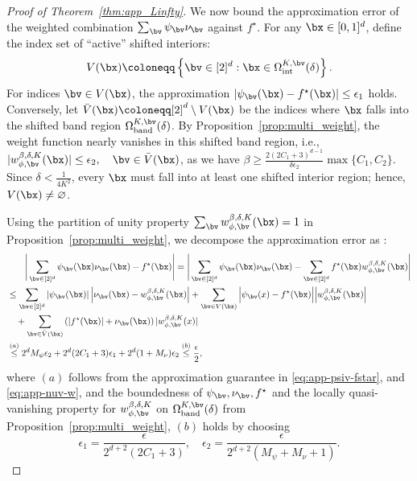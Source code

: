 \documentclass[11pt]{article}
\begin{document}
\begin{proof}[Proof of Theorem~\ref{thm:app_Linfty}]
    
    We now bound the approximation error of the weighted combination $\sum_{\bv} \psi_{\bv} \nu_{\bv}$ against $f^{\star}$.
    For any $\bx \in [0,1]^d$, define the index set of ``active'' shifted interiors:
    \begin{equation*}
        V(\bx) \coloneqq  \left\{ \bv \in [2]^d : \bx \in \Omega_{\mathrm{int}}^{K, \bv}(\delta) \right\}.
    \end{equation*}
    For indices $\bv \in V(\bx)$, the approximation $|\psi_{\bv}(\bx) - f^{\star}(\bx)| \leq \epsilon_1$ holds. Conversely, let $\bar{V}(\bx) \coloneqq  [2]^d \setminus V(\bx)$ be the indices where $\bx$ falls into the shifted band region $\Omega_{\mathrm{band}}^{K, \bv}(\delta)$. By Proposition~\ref{prop:multi_weight}, the weight function nearly vanishes in this shifted band region, i.e., $|w_{\phi, \bv}^{\beta,\delta, K}(\bx)| \leq \epsilon_2, \quad \bv \in \bar{{V}}(\bx)$, as we have $\beta \ge \frac{2(2C_1+3)^{d-1}}{\delta \epsilon_2} \max\{C_1,C_2\}$. Since $\delta  < \frac{1}{4K^2}$, every $\bx$ must fall into at least one shifted interior region; hence, ${V}(\bx) \neq \varnothing$.

    

    Using the partition of unity property $\sum_{\bv} w_{\phi, \bv}^{\beta, \delta, K}(\bx) = 1$ in Proposition~\ref{prop:multi_weight}, we decompose the approximation error as :
    \begin{equation}
        \begin{aligned}
                    & \quad \quad \Bigg| \sum_{\bv \in [2]^d} \psi_{\bv}(\bx) \nu_{\bv}(\bx)  - f^{\star}(\bx)\Bigg| =  \Bigg|\sum_{\bv \in [2]^d} \psi_{\bv}(\bx) \nu_{\bv}(\bx) - \sum_{\bv \in [2]^d}f^{\star}(\bx) w_{\phi, \bv}^{\beta, \delta, K}(\bx)\Bigg| \\
                    & \leq \sum_{\bv \in [2]^d} \left|\psi_{\bv}(\bx)\right| \left|\nu_{\bv}(\bx) - w_{\phi, \bv}^{\beta, \delta, K}(\bx) \right| +  \sum_{\bv \in {V}(\bx)} \Big| \psi_{\bv}(x) - f^{\star}(\bx) \Big| \Big| w_{\phi, \bv}^{\beta, \delta,K}(\bx)\Big|    \\
                    &  \quad +   \sum_{\bv \in \bar{{V}}(\bx) } \left( |f^{\star}(\bx)| + \nu_{\bv}(\bx) \right) |w_{\phi, \bv}^{\beta, \delta, K}(x)| \\
                    & \overset{(a)}{\leq } 2^d M_{\psi} \epsilon_2 + 2^d(2C_1+3) \epsilon_1 + 2^d (1 + M_{\nu}) \epsilon_2  \overset{(b)}{\leq} \frac{\epsilon}{2},
        \end{aligned}
        \label{eq:app-psinu-f*}
    \end{equation}
    where $(a)$ follows from the approximation guarantee in \eqref{eq:app-psiv-fstar}, and \eqref{eq:app-nuv-w}, and the boundedness of $\psi_{\bv}, \nu_{\bv},f^{\star}$ and the locally quasi-vanishing property for $w_{\phi,\bv}^{\beta,\delta, K}$ on $\Omega_{\mathrm{band}}^{K, \bv}(\delta)$ from Proposition~\ref{prop:multi_weight}, $(b)$ holds by choosing 
    \begin{equation*}
        \epsilon_1 = \frac{\epsilon}{2^{d+2}(2C_1+3)}, \quad \epsilon_2 = \frac{\epsilon}{2^{d+2}(M_{\psi} + M_{\nu} + 1)}.
    \end{equation*}



\end{proof}
\end{document}
